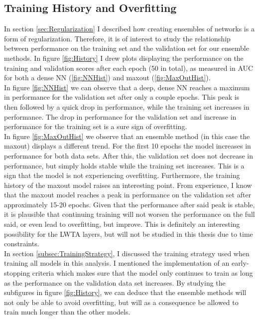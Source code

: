 \subsection{Training History and Overfitting}\label{subsec:Overfitting}
In section \ref{sec:Regularization} I described how creating ensembles of networks is a form of regularization. Therefore,
it is of interest to study the relationship between performance on the training set and the validation set for our ensemble 
methods. In figure \ref{fig:History} I drew plots displaying the performance on the training and validation scores after each 
epoch (50 in total), as measured in \ac{AUC} for both a dense \ac{NN} (\ref{fig:NNHist}) and maxout (\ref{fig:MaxOutHist}).
\\ 
In figure \ref{fig:NNHist} we can observe that a deep, dense \ac{NN} reaches a maximum in performance for the validation set after only 
a couple epochs. This peak is then followed by a quick drop in performance, while the training set increases in performance. 
The drop in performance for the validation set and increase in performance for the training set is a sure sign of overfitting. 
\\
In figure \ref{fig:MaxOutHist} we observe that an ensemble method (in this case the maxout) displays a different trend. For the first 
10 epochs the model increases in performance for both data sets. After this, the validation set does not decrease in performance, but 
simply holds stable while the training set increases. This is a sign that the model is not experiencing overfitting. Furthermore, the 
training history of the maxout model raises an interesting point. From experience, I know that the maxout model reaches a peak in performance
on the validation set after approximately 15-20 epochs. Given that the performance after said peak is stable, it is plausible that continuing 
training will not worsen the performance on the full said, or even lead to overfitting, but improve. This is definitely an interesting possibility
for the \ac{LWTA} layers, but will not be studied in this thesis due to time constraints.
\\
In section \ref{subsec:TrainingStrategy}, I discussed the training strategy used when training all models in this analysis. I mentioned 
the implementation of an early-stopping criteria which makes sure that the model only continues to train as long as the performance on the 
validation data set increases. By studying the subfigures in figure \ref{fig:History}, we can deduce that the ensemble methods will not only 
be able to avoid overfitting, but will as a consequence be allowed to train much longer than the other models.
